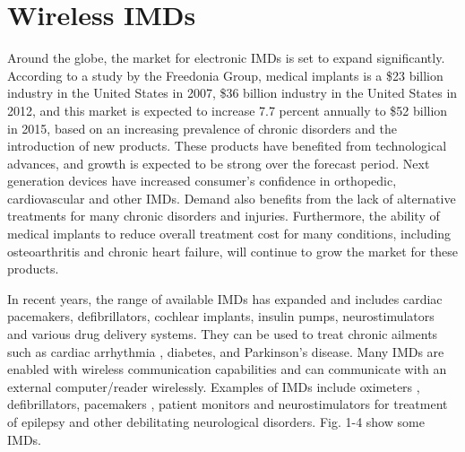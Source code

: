 \section{Wireless IMDs}

\label{sec:1} Around the globe, the market for electronic
IMDs is set to expand significantly. According to a study by the Freedonia Group, medical implants is a
\$23 billion industry in the United States in 2007, \$36 billion
industry in the United States in 2012, and this market is expected
to increase 7.7 percent annually to \$52 billion in 2015, based on
an increasing prevalence of chronic disorders and the introduction
of new products. These products have benefited from technological
advances, and growth is expected to be strong over the forecast
period. Next generation devices have increased consumer's confidence
in orthopedic, cardiovascular and other IMDs.
Demand also benefits from the lack of alternative treatments for
many chronic disorders and injuries. Furthermore, the ability of
medical implants to reduce overall treatment cost for many
conditions, including osteoarthritis and chronic heart failure, will
continue to grow the market for these products.

In recent years, the range of available IMDs
has expanded and includes cardiac pacemakers, defibrillators,
cochlear implants, insulin pumps, neurostimulators and various drug
delivery systems. They can be used to treat chronic ailments such as
cardiac arrhythmia \cite{1}, diabetes, and Parkinson's disease. Many
IMDs are enabled with wireless communication capabilities and can
communicate with an external computer/reader wirelessly. Examples of IMDs include
oximeters \cite{2}, defibrillators, pacemakers \cite{3}, patient
monitors \cite{4} and neurostimulators for treatment of epilepsy and
other debilitating neurological disorders. Fig. 1-4 show some
IMDs.





